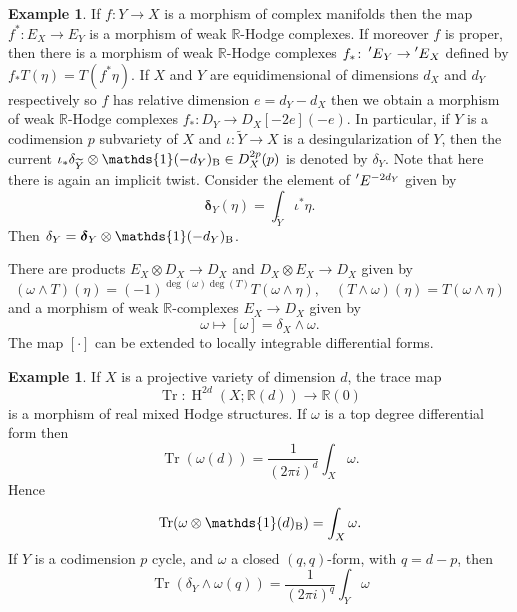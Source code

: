 \documentclass[11pt,a4paper]{amsart}
\newcommand{\Betti}{\text{\rm B}}
\newcommand{\R}{\mathds{R}}
\newcommand{\bfone}{{\mathds{1}}}
\newcommand{\bfdelta}{{\boldsymbol{\delta}}}
\DeclareMathOperator {\Tr}{Tr}
\DeclareMathOperator{\rH}{H}
\numberwithin{equation}{section}
\theoremstyle{plain}
\theoremstyle{definition}
\newtheorem{ex}[prop]{Example}
\begin{document}
\begin{ex}
  If $f\colon Y\to X$ is a morphism of complex manifolds then the map
  $f^{\ast}\colon E_{X}\to E_{Y}$ is a morphism of weak $\R$-Hodge
  complexes. If moreover $f$ is proper, then there is a morphism of
  weak $\R$-Hodge complexes $f_{\ast}\colon
  \prescript{\prime}{}{E}_{Y}\to \prescript{\prime}{}{E}_{X}$ defined
  by $f_{\ast}T(\eta)=T(f^{\ast}\eta)$. If $X$ and $Y$ are
  equidimensional of dimensions $d_{X}$ and $d_{Y}$ respectively so $f$
  has relative dimension $e=d_{Y}-d_{X}$ then we obtain a morphism of
  weak $\R$-Hodge complexes $f_{\ast}\colon D_{Y}\to
  D_{X}[-2e](-e)$. In particular, if $Y$ is a codimension $p$ subvariety of
  $X$ and $\iota\colon \widetilde Y\to X$ is a desingularization of
  $Y$, then the current $\iota _{\ast}\delta _{\widetilde Y}\otimes
  \bfone(-d_{Y})_{\Betti}\in D^{2p}_{X}(p)$ is denoted by $\delta
  _{Y}$. Note that here there is again an implicit twist.
  Consider the element of $\prescript{\prime}{}{E}^{-2d_{Y}}$ given by
  \begin{displaymath}
    \bfdelta _{Y}(\eta)=\int_{\widetilde Y}\iota ^{\ast}\eta.
  \end{displaymath}
   Then $\delta _{Y}=\bfdelta _{Y}\otimes
  \bfone(-d_{Y})_{\Betti}$.

  There are products $E_{X}\otimes D_{X}\to D_{X}$ and $D_{X}\otimes
  E_{X}\to D_{X}$ given by
  \begin{displaymath}
    (\omega \wedge T)(\eta)=(-1)^{\deg(\omega )\deg(T)}T(\omega
    \wedge \eta),\quad
    (T \wedge \omega) (\eta)=T(\omega
    \wedge \eta)
  \end{displaymath}
  and a morphism of weak $\R$-complexes $E_{X}\to D_{X}$ given by
  \begin{displaymath}
    \omega \mapsto [\omega ]=\delta _{X}\wedge \omega.
  \end{displaymath}
 The map $[\cdot
  ]$ can be extended to locally integrable differential forms.
 \end{ex}

 \begin{ex} \label{exm:12} If $X$ is a projective variety of dimension $d$, the
   trace map 
   \begin{displaymath}
     \Tr\colon \rH^{2d}(X;\R(d))\to \R(0)
   \end{displaymath}
   is a morphism of real mixed
   Hodge structures.  If
   $\omega $ is a top degree differential form then
   \begin{equation}\label{eq:35}
     \Tr(\omega(d))=\frac{1}{(2\pi i)^{d}}\int _{X}\omega .
   \end{equation}
   Hence
   \begin{displaymath}
     \Tr(\omega \otimes \bfone(d)_{\Betti})=\int _{X}\omega .
   \end{displaymath}
   If $Y$ is a codimension $p$ cycle, and $\omega $ a closed
   $(q,q)$-form, with $q=d-p$, then
   \begin{displaymath}
     \Tr(\delta _{Y}\wedge \omega(q))=\frac{1}{(2\pi i)^{q}}
     \int_{Y}\omega 
   \end{displaymath}
   
 \end{ex}
 
\end{document}

